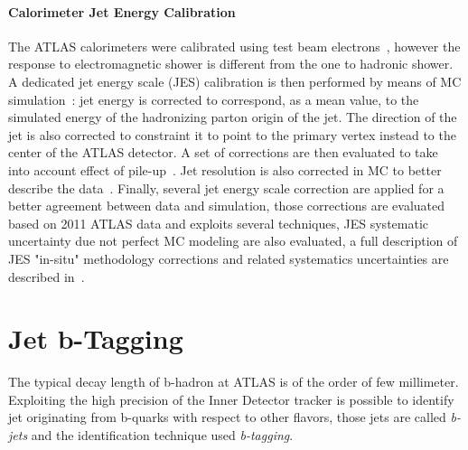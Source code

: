 \paragraph{Calorimeter Jet Energy Calibration}
The ATLAS calorimeters were calibrated using test beam electrons~\cite{EMcalibration}, however  the response
to electromagnetic shower  is different from the one to hadronic shower. A dedicated jet energy scale
(JES) calibration is then performed by means of MC simulation~\cite{jesinsitu}: 
jet energy is corrected to correspond, as a mean value, to the simulated energy 
of the hadronizing parton origin of the jet. The direction of the jet is also corrected to constraint it to point
to the primary vertex instead to the center of the ATLAS detector. A set of corrections are then evaluated to take into account
effect of pile-up~\cite{jespileup, jesarea}. Jet resolution is also corrected in MC to better describe the data~\cite{jer}. 
Finally, several jet energy scale correction are applied for a better agreement between 
data and simulation, those corrections are evaluated based on 2011 ATLAS data and  
exploits several techniques, JES systematic uncertainty due not perfect MC modeling are also evaluated,
a full description of JES "in-situ" methodology corrections and related systematics uncertainties are 
described in~\cite{jesinsitu, JES}. %


\section{Jet b-Tagging}
The typical decay length of b-hadron at ATLAS is of the order of few millimeter. Exploiting the high precision of the
Inner Detector tracker is possible to identify jet originating from b-quarks with respect to other flavors, 
those jets are called \emph{b-jets} and the identification technique used \emph{b-tagging}.

